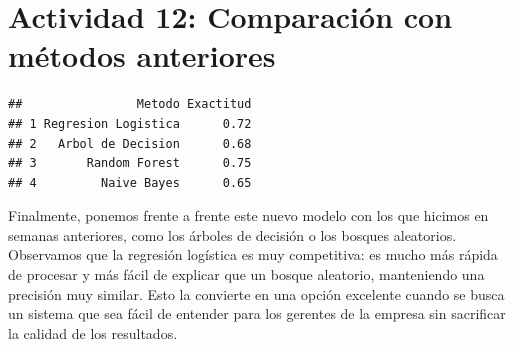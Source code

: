\documentclass[
]{article}
\begin{document}
\section{Actividad 12: Comparación con métodos
anteriores}\label{actividad-12-comparaciuxf3n-con-muxe9todos-anteriores}

\begin{verbatim}
##                Metodo Exactitud
## 1 Regresion Logistica      0.72
## 2   Arbol de Decision      0.68
## 3       Random Forest      0.75
## 4         Naive Bayes      0.65
\end{verbatim}

Finalmente, ponemos frente a frente este nuevo modelo con los que
hicimos en semanas anteriores, como los árboles de decisión o los
bosques aleatorios. Observamos que la regresión logística es muy
competitiva: es mucho más rápida de procesar y más fácil de explicar que
un bosque aleatorio, manteniendo una precisión muy similar. Esto la
convierte en una opción excelente cuando se busca un sistema que sea
fácil de entender para los gerentes de la empresa sin sacrificar la
calidad de los resultados.
\end{document}
